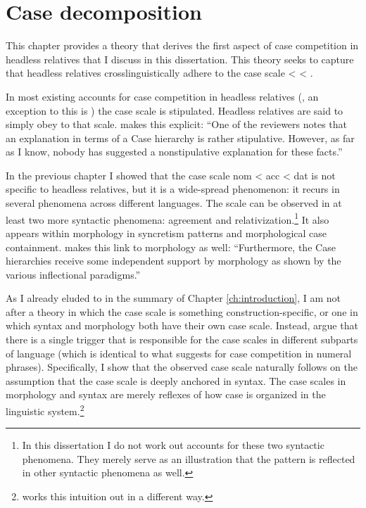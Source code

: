 
\chapter{Case decomposition}\label{ch:decomposition}

This chapter provides a theory that derives the first aspect of case competition in headless relatives that I discuss in this dissertation.
This theory seeks to capture that headless relatives crosslinguistically adhere to the case scale  <  < .

In most existing accounts for case competition in headless relatives (\citealt[cf.][]{pittner1995,vogel2001,grosu2003,harbert1978}, an exception to this is \citealt{himmelreich2017}) the case scale is stipulated. Headless relatives are said to simply obey to that scale.  makes this explicit: ``One of the reviewers notes that an explanation in terms of a Case hierarchy is rather stipulative. However, as far as I know, nobody has suggested a nonstipulative explanation for these facts.''

In the previous chapter I showed that the case scale \ac{nom} < \ac{acc} < \ac{dat} is not specific to headless relatives, but it is a wide-spread phenomenon: it recurs in several phenomena across different languages. The scale can be observed in at least two more syntactic phenomena: agreement and relativization.\footnote{
In this dissertation I do not work out accounts for these two syntactic phenomena. They merely serve as an illustration that the pattern is reflected in other syntactic phenomena as well.}
It also appears within morphology in syncretism patterns and morphological case containment.  makes this link to morphology as well: ``Furthermore, the Case hierarchies receive some independent support by morphology as shown by the various inflectional paradigms.''

As I already eluded to in the summary of Chapter \ref{ch:introduction}, I am not after a theory in which the case scale is something construction-specific, or one in which syntax and morphology both have their own case scale. Instead, argue that there is a single trigger that is responsible for the case scales in different subparts of language (which is identical to what \citealt{caha2019} suggests for case competition in numeral phrases). Specifically, I show that the observed case scale naturally follows on the assumption that the case scale is deeply anchored in syntax. The case scales in morphology and syntax are merely reflexes of how case is organized in the linguistic system.\footnote{
\citet{himmelreich2017} works this intuition out in a different way.
}

